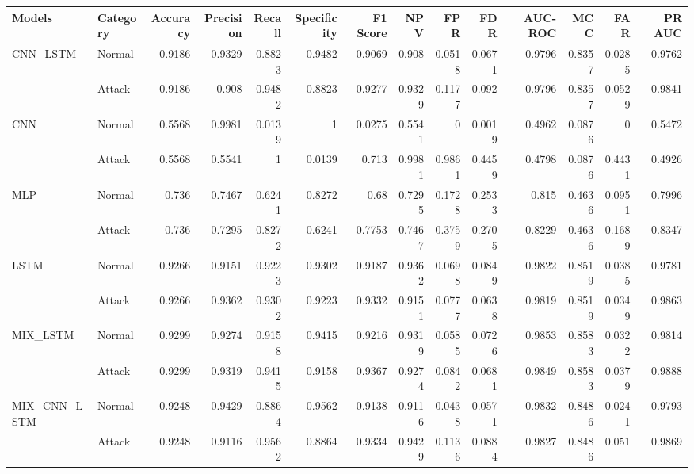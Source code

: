 \begin{tabular}{llrrrrrrrrrrrr}
\hline
 Models         & Category   &   Accuracy &   Precision &   Recall &   Specificity &   F1 Score &    NPV &    FPR &    FDR &   AUC-ROC &    MCC &    FAR &   PR AUC \\
\hline
 CNN\_LSTM      & Normal     &     0.9186 &      0.9329 &   0.8823 &        0.9482 &     0.9069 & 0.908  & 0.0518 & 0.0671 &    0.9796 & 0.8357 & 0.0285 &   0.9762 \\
                & Attack     &     0.9186 &      0.908  &   0.9482 &        0.8823 &     0.9277 & 0.9329 & 0.1177 & 0.092  &    0.9796 & 0.8357 & 0.0529 &   0.9841 \\
 CNN            & Normal     &     0.5568 &      0.9981 &   0.0139 &        1      &     0.0275 & 0.5541 & 0      & 0.0019 &    0.4962 & 0.0876 & 0      &   0.5472 \\
                & Attack     &     0.5568 &      0.5541 &   1      &        0.0139 &     0.713  & 0.9981 & 0.9861 & 0.4459 &    0.4798 & 0.0876 & 0.4431 &   0.4926 \\
 MLP            & Normal     &     0.736  &      0.7467 &   0.6241 &        0.8272 &     0.68   & 0.7295 & 0.1728 & 0.2533 &    0.815  & 0.4636 & 0.0951 &   0.7996 \\
                & Attack     &     0.736  &      0.7295 &   0.8272 &        0.6241 &     0.7753 & 0.7467 & 0.3759 & 0.2705 &    0.8229 & 0.4636 & 0.1689 &   0.8347 \\
 LSTM           & Normal     &     0.9266 &      0.9151 &   0.9223 &        0.9302 &     0.9187 & 0.9362 & 0.0698 & 0.0849 &    0.9822 & 0.8519 & 0.0385 &   0.9781 \\
                & Attack     &     0.9266 &      0.9362 &   0.9302 &        0.9223 &     0.9332 & 0.9151 & 0.0777 & 0.0638 &    0.9819 & 0.8519 & 0.0349 &   0.9863 \\
 MIX\_LSTM      & Normal     &     0.9299 &      0.9274 &   0.9158 &        0.9415 &     0.9216 & 0.9319 & 0.0585 & 0.0726 &    0.9853 & 0.8583 & 0.0322 &   0.9814 \\
                & Attack     &     0.9299 &      0.9319 &   0.9415 &        0.9158 &     0.9367 & 0.9274 & 0.0842 & 0.0681 &    0.9849 & 0.8583 & 0.0379 &   0.9888 \\
 MIX\_CNN\_LSTM & Normal     &     0.9248 &      0.9429 &   0.8864 &        0.9562 &     0.9138 & 0.9116 & 0.0438 & 0.0571 &    0.9832 & 0.8486 & 0.0241 &   0.9793 \\
                & Attack     &     0.9248 &      0.9116 &   0.9562 &        0.8864 &     0.9334 & 0.9429 & 0.1136 & 0.0884 &    0.9827 & 0.8486 & 0.051  &   0.9869 \\
\hline
\end{tabular}